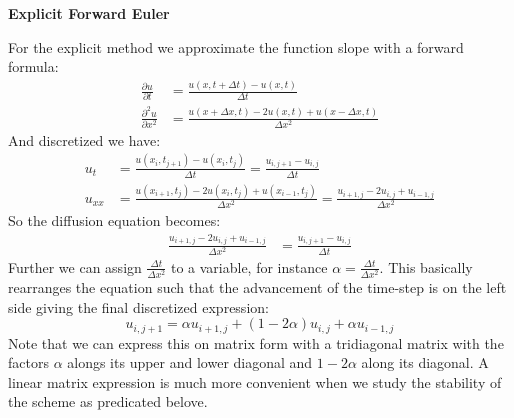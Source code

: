 \documentclass[a4paper,11pt]{article}
\newcommand{\prtl}{\partial}
\newcommand{\vsp}{\vspace{0.2cm}}
\newcommand{\secti}[1]{\begin{center} \Large\bf{{#1}} \end{center}}
\begin{document}
\secti{Explicit Forward Euler}
    For the explicit method we approximate the function slope with a forward formula:
    \begin{align*}
        \frac{\prtl u}{\prtl t} &= \frac{u(x,t+\Delta t) - u(x,t)}{\Delta t}\\
        \frac{\prtl^2 u}{\prtl x^2} &= \frac{u(x+\Delta x,t) - 2u(x,t) + u(x-\Delta x,t)}{\Delta x^2}
    \end{align*}
    And discretized we have:
    \begin{align*}
        u_t &= \frac{u(x_i,t_{j+1}) - u(x_i,t_j)}{\Delta t} = \frac{u_{i,j+1} - u_{i,j}}{\Delta t}\\
        u_{xx} &= \frac{u(x_{i+1},t_j) - 2u(x_i,t_j) + u(x_{i-1},t_j)}{\Delta x^2} = \frac{u_{i+1,j} - 2u_{i,j} + u_{i-1,j}}{\Delta x^2}
    \end{align*}
    So the diffusion equation becomes:
    \begin{align*}
        \frac{u_{i+1,j} - 2u_{i,j} + u_{i-1,j}}{\Delta x^2} &= \frac{u_{i,j+1} - u_{i,j}}{\Delta t}
    \end{align*}
    Further we can assign $\frac{\Delta t}{\Delta x^2}$ to a variable, for instance $\alpha = \frac{\Delta t}{\Delta x^2}$. This basically rearranges the equation such that the advancement of the time-step is on the left side giving the final discretized expression:
    \begin{equation*}
        u_{i,j+1} = \alpha u_{i+1,j} + (1-2\alpha)u_{i,j} + \alpha u_{i-1,j}
    \end{equation*}
    Note that we can express this on matrix form with a tridiagonal matrix with the factors $\alpha$ alongs its upper and lower diagonal and $1-2\alpha$ along its diagonal. A linear matrix expression is much more convenient when we study the stability of the scheme as predicated belove.\vsp\\
\end{document}

